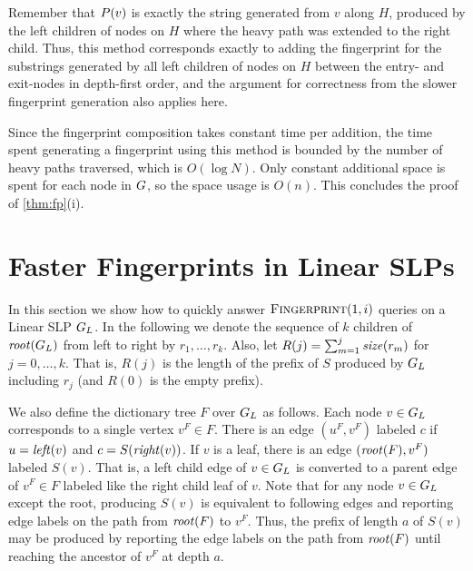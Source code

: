 Remember that $P(v)$ is exactly the string generated from $v$ along $H$, produced by the left children of nodes on $H$ where the heavy path was extended to the right child. Thus, this method corresponds exactly to adding the fingerprint for the substrings generated by all left children of nodes on $H$ between the entry- and exit-nodes in depth-first order, and the argument for correctness from the slower fingerprint generation also applies here.

Since the fingerprint composition takes constant time per addition, the time spent generating a fingerprint using this method is bounded by the number of heavy paths traversed, which is $O(\log N)$. Only constant additional space is spent for each node in $G$, so the space usage is $O(n)$. This concludes the proof of \autoref{thm:fp}(i).

\section{Faster Fingerprints in Linear SLPs}
In this section we show how to quickly answer $\textsc{Fingerprint}(1, i)$ queries on a Linear SLP $G_L$. In the following we denote the sequence of $k$ children of $\mathit{root}(G_L)$ from left to right by $r_1, \ldots, r_k$. Also, let $R(j) = \sum_{m=1}^j \mathit{size}(r_m)$ for $j = 0, \ldots, k$. That is, $R(j)$ is the length of the prefix of $S$ produced by $G_L$ including $r_j$ (and $R(0)$ is the empty prefix).

We also define the dictionary tree $F$ over $G_L$ as follows. Each node $v \in G_L$ corresponds to a single vertex $v^F \in F$. There is an edge $(u^F, v^F)$ labeled $c$ if $u = \mathit{left}(v)$ and $c = S(\mathit{right}(v))$. If $v$ is a leaf, there is an edge $(\mathit{root}(F), v^F)$ labeled $S(v)$. That is, a left child edge of $v \in G_L$ is converted to a parent edge of $v^F \in F$ labeled like the right child leaf of $v$. Note that for any node $v \in G_L$ except the root, producing $S(v)$ is equivalent to following edges and reporting edge labels on the path from $\mathit{root}(F)$ to $v^F$. Thus, the prefix of length $a$ of $S(v)$ may be produced by reporting the edge labels on the path from $\mathit{root}(F)$ until reaching the ancestor of $v^F$ at depth $a$.



